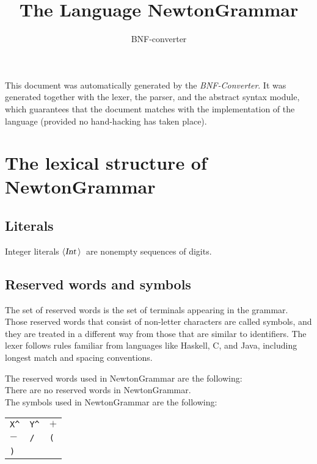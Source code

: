 \documentclass[a4paper,11pt]{article}
\author{BNF-converter}
\title{The Language NewtonGrammar}
\begin{document}
\maketitle

\newcommand{\emptyP}{\mbox{$\epsilon$}}
\newcommand{\terminal}[1]{\mbox{{\texttt {#1}}}}
\newcommand{\nonterminal}[1]{\mbox{$\langle \mbox{{\sl #1 }} \! \rangle$}}
\newcommand{\arrow}{\mbox{::=}}
\newcommand{\delimit}{\mbox{$|$}}
\newcommand{\reserved}[1]{\mbox{{\texttt {#1}}}}
\newcommand{\literal}[1]{\mbox{{\texttt {#1}}}}
\newcommand{\symb}[1]{\mbox{{\texttt {#1}}}}

This document was automatically generated by the {\em BNF-Converter}. It was generated together with the lexer, the parser, and the abstract syntax module, which guarantees that the document matches with the implementation of the language (provided no hand-hacking has taken place).

\section*{The lexical structure of NewtonGrammar}

\subsection*{Literals}
Integer literals \nonterminal{Int}\ are nonempty sequences of digits.




\subsection*{Reserved words and symbols}
The set of reserved words is the set of terminals appearing in the grammar. Those reserved words that consist of non-letter characters are called symbols, and they are treated in a different way from those that are similar to identifiers. The lexer follows rules familiar from languages like Haskell, C, and Java, including longest match and spacing conventions.

The reserved words used in NewtonGrammar are the following: \\

There are no reserved words in NewtonGrammar.\\

The symbols used in NewtonGrammar are the following: \\

\begin{tabular}{lll}
{\symb{X\^}} &{\symb{Y\^}} &{\symb{{$+$}}} \\
{\symb{{$-$}}} &{\symb{/}} &{\symb{(}} \\
{\symb{)}} & & \\
\end{tabular}\\
\end{document}
